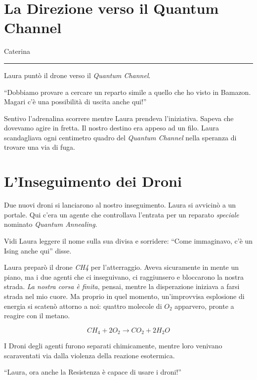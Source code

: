 \section{La Direzione verso il Quantum Channel}
\vspace{1em}
\begin{center}Caterina\end{center}
\hrule
\vspace{1em}
Laura puntò il drone verso il \textit{Quantum Channel}. \begin{dialogue}
 \enquote{Dobbiamo provare a cercare un reparto simile a quello che ho visto in Bamazon. Magari c'è una possibilità di uscita anche qui!}
\end{dialogue}

Sentivo l'adrenalina scorrere mentre Laura prendeva l'iniziativa. Sapeva che dovevamo agire in fretta. Il nostro destino era appeso ad un filo.  Laura scandagliava ogni centimetro quadro del \textit{Quantum Channel}  nella speranza di trovare una via di fuga.

\section{L'Inseguimento dei Droni}
Due nuovi droni si lanciarono al nostro inseguimento. Laura si avvicinò a un portale. Qui c'era un agente che  controllava l’entrata per un reparato \textit{speciale} nominato  \textit{Quantum Annealing}.

Vidi Laura leggere il nome sulla sua divisa e sorridere: ``Come immaginavo, c'è un Ising anche qui'' disse.

Laura preparò il drone \textit{CH4} per l'atterraggio. Aveva sicuramente in mente un piano, ma i due agenti che ci inseguivano, ci raggiunsero e  bloccarono  la nostra strada. \emph{La nostra corsa è finita}, pensai, mentre la disperazione iniziava a farsi strada nel mio cuore. Ma proprio in quel momento, un'improvvisa esplosione di energia si scatenò attorno a noi: quattro molecole di \( O_2 \) apparvero, pronte a reagire con il metano.

\[
CH_4 + 2O_2 \rightarrow CO_2 + 2H_2O
\]

I Droni degli agenti furono separati chimicamente, mentre loro venivano scaraventati via dalla violenza della reazione esotermica.

\begin{dialogue}
 \enquote{Laura, ora anche la Resistenza è capace di usare i droni!}
\end{dialogue}

